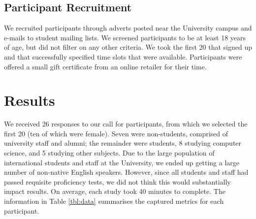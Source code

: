\documentclass{sigchi}
\begin{document}
\subsection{Participant Recruitment}
We recruited participants through adverts posted near the University campus and e-mails to student mailing lists.  We screened participants to be at least 18 years of age, but did not filter on any other criteria.  We took the first 20 that signed up and that successfully specified time slots that were available.   Participants were offered a small gift certificate from an online retailer for their time. 





\newpage
\section{Results}

We received 26 responses to our call for participants, from which we selected the first 20 (ten of which were female). Seven were non-students, comprised of university staff and alumni; the remainder were students, 8 studying computer science, and 5 studying other subjects.  Due to the large population of international students and staff at the University, we ended up getting a large number of non-native English speakers.  However, since all students and staff had passed requisite proficiency tests, we did not think this would substantially impact results.  On average, each study took 40 minutes to complete.  The information in Table \ref{tbl:data} summarises the captured metrics for each participant.
\end{document}
